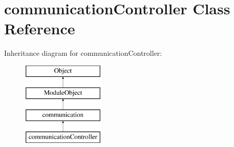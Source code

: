 \hypertarget{classcommunicationController}{}\section{communication\+Controller Class Reference}
\label{classcommunicationController}
Inheritance diagram for communication\+Controller\+:\begin{figure}[H]
\begin{center}
\leavevmode
\includegraphics[height=4.000000cm]{classcommunicationController}
\end{center}
\end{figure}
